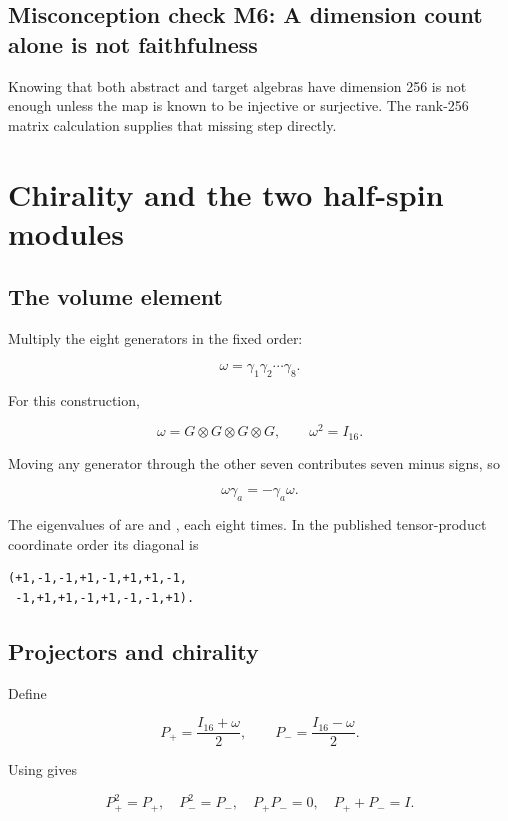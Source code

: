 \documentclass[11pt]{article}
\begin{document}
\subsection{Misconception check M6: A dimension count alone is not faithfulness}

Knowing that both abstract and target algebras have dimension 256 is not enough unless the map is known to be injective or surjective. The rank-256 matrix calculation supplies that missing step directly.

\section{Chirality and the two half-spin modules}

\subsection{The volume element}

Multiply the eight generators in the fixed order:

\[
\omega=\gamma_1\gamma_2\cdots\gamma_8.
\]

For this construction,

\[
\omega=G\mathbin{\otimes}G\mathbin{\otimes}G\mathbin{\otimes}G,
\qquad \omega^2=I_{16}.
\]

Moving any generator through the other seven contributes seven minus signs, so

\[
\omega\gamma_a=-\gamma_a\omega.
\]

The eigenvalues of \texttt{} are \texttt{} and \texttt{}, each eight times. In the published tensor-product coordinate order its diagonal is

\begin{Verbatim}[fontsize=\small]
(+1,-1,-1,+1,-1,+1,+1,-1,
 -1,+1,+1,-1,+1,-1,-1,+1).
\end{Verbatim}

\subsection{Projectors and chirality}

Define

\[
P_+=\frac{I_{16}+\omega}{2},
\qquad
P_-=\frac{I_{16}-\omega}{2}.
\]

Using \texttt{} gives

\[
P_+^2=P_+,
\quad P_-^2=P_-,
\quad P_+P_-=0,
\quad P_++P_-=I.
\]
\end{document}
